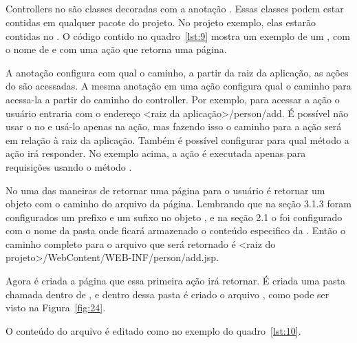 
\subsection{}

Controllers no  são classes decoradas com a anotação . Essas classes podem estar contidas em qualquer pacote do projeto. No projeto exemplo, elas estarão contidas no . O código contido no quadro~\ref{lst:9} mostra um exemplo de um , com o nome de  e com uma ação que retorna uma página.


A anotação  configura com qual o caminho, a partir da raiz da aplicação, as ações do  são acessadas. A mesma anotação em uma ação configura qual o caminho para acessa-la a partir do caminho do controller. Por exemplo, para acessar a ação  o usuário entraria com o endereço <raiz da aplicação>/person/add. É possível não usar o  no  e usá-lo apenas na ação, mas fazendo isso o caminho para a ação será em relação à raiz da aplicação. Também é possível configurar para qual método  a ação irá responder. No exemplo acima, a ação é executada apenas para requisições usando o método .

No  uma das maneiras de retornar uma página para o usuário é retornar um objeto  com o caminho do arquivo da página. Lembrando que na seção 3.1.3 foram configurados um prefixo e um sufixo no objeto , e na seção 2.1 o  foi configurado com o nome da pasta onde ficará armazenado o conteúdo especifico da . Então o caminho completo para o arquivo que será retornado é <raiz do projeto>/WebContent/WEB-INF/person/add.jsp.

Agora é criada a página que essa primeira ação irá retornar. É criada uma pasta chamada  dentro de , e dentro dessa pasta é criado o arquivo , como pode ser visto na Figura~\ref{fig:24}.


O conteúdo do arquivo  é editado como no exemplo do quadro~\ref{lst:10}.

